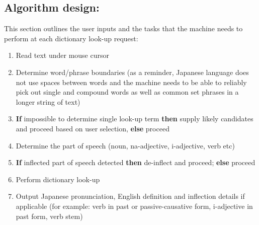 \documentclass{article}
\begin{document}
\subsection{Algorithm design:}
This section outlines the user inputs and the tasks that the machine needs to perform at each dictionary look-up request:
\begin{enumerate}
    \item Read text under mouse cursor
    \item Determine word/phrase boundaries (as a reminder, Japanese language does not use spaces between words and the machine needs to be able to reliably pick out single and compound words as well as common set phrases in a longer string of text)
    \item \textbf{If} impossible to determine single look-up term \textbf{then} supply likely candidates and proceed based on user selection, \textbf{else} proceed
    \item Determine the part of speech (noun, na-adjective, i-adjective, verb etc)
    \item \textbf{If} inflected part of speech detected \textbf{then} de-inflect and proceed; \textbf{else} proceed
    \item Perform dictionary look-up
    \item Output Japanese pronunciation, English definition and inflection details if applicable (for example: verb in past or passive-causative form, i-adjective in past form, verb stem)
\end{enumerate}
\end{document}
